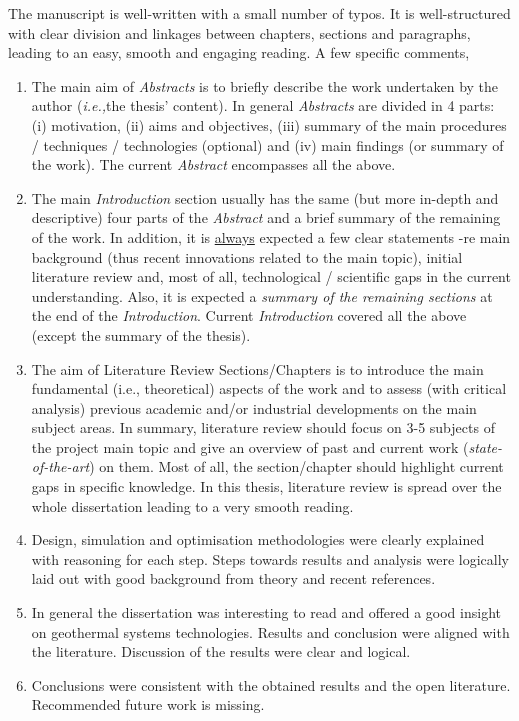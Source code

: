 \documentclass[14pt,twoside]{report}
\newcommand{\ie}{{\it i.e.,}}
\begin{document}
The manuscript is well-written with a small number of typos. It is well-structured with clear division and linkages between chapters, sections and paragraphs, leading to an easy, smooth and engaging reading. A few specific comments,
\begin{enumerate}
%
\item The main aim of {\it Abstracts} is to briefly describe the work undertaken by the author (\ie the thesis' content). In general {\it Abstracts} are divided in 4 parts: (i) motivation, (ii) aims and objectives, (iii) summary of the main procedures / techniques / technologies (optional) and (iv) main findings (or summary of the work). The current {\it Abstract} encompasses all the above.
%
\item The main {\it Introduction} section usually has the same (but more in-depth and descriptive) four parts of the {\it Abstract} and a brief summary of the remaining of the work. In addition, it is \underline{always} expected a few clear statements -re main background (thus recent innovations related to the main topic), initial literature review and, most of all, technological / scientific gaps in the current understanding. Also, it is expected a {\it summary of the remaining sections} at the end of the {\it Introduction}.  Current {\it Introduction} covered all the above (except the summary of the thesis).
%
\item The aim of Literature Review Sections/Chapters is to introduce the main fundamental (i.e., theoretical) aspects of the work and to assess (with critical analysis) previous academic and/or industrial developments on the main subject areas. In summary, literature review should focus on 3-5 subjects of the project main topic and give an overview of past and current work ({\it state-of-the-art}) on them. Most of all, the section/chapter should highlight current gaps in specific knowledge. In this thesis, literature review is spread over the whole dissertation leading to a very smooth reading.
%
\item Design, simulation and optimisation methodologies were clearly explained with reasoning for each step. Steps towards results and analysis were logically laid out with good background from theory and recent references.
%
\item In general the dissertation was interesting to read and offered a good insight on geothermal systems technologies. Results and conclusion were aligned with the literature. Discussion of the results were clear and logical. 
%
\item Conclusions were consistent with the obtained results and the open literature. Recommended future work is missing.
%
\end{enumerate}
\end{document}

